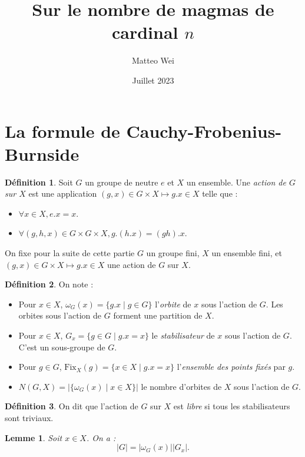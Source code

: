 \documentclass{article}
\title{Sur le nombre de magmas de cardinal $n$}
\author{Matteo Wei}
\date{Juillet 2023}
\newtheorem*{lemme}{Lemme}
\theoremstyle{definition}
\newtheorem*{definition}{Définition}
\theoremstyle{remark}
\begin{document}
\maketitle

\section{La formule de Cauchy-Frobenius-Burnside}

\begin{definition}
    Soit $G$ un groupe de neutre $e$ et $X$ un ensemble. Une \textit{action de $G$ sur $X$} est une application $(g,x)\in G\times X \mapsto g.x\in X$ telle que :
    \begin{itemize}
        \item $\forall x\in X, e.x=x$.
        \item $\forall (g,h,x)\in G\times G\times X, g.(h.x)=(gh).x$.
    \end{itemize}
\end{definition}

On fixe pour la suite de cette partie $G$ un groupe fini, $X$ un ensemble fini, et $(g,x)\in G\times X \mapsto g.x\in X$ une action de $G$ sur $X$.

\begin{definition}
    On note :
    \begin{itemize}
        \item Pour $x\in X$, $\omega_G(x)=\{g.x\mid g\in G\}$ l'\textit{orbite} de $x$ sous l'action de $G$. Les orbites sous l'action de $G$ forment une partition de $X$.
        \item Pour $x\in X$, $G_x=\{g\in G\mid g.x=x\}$ le \textit{stabilisateur} de $x$ sous l'action de $G$. C'est un sous-groupe de $G$.
        \item Pour $g\in G$, $\mathrm{Fix}_X(g)=\{x\in X\mid g.x=x\}$ l'\textit{ensemble des points fixés} par $g$.
        \item $N(G,X)=|\{\omega_G(x)\mid x\in X\}|$ le nombre d'orbites de $X$ sous l'action de $G$.
    \end{itemize}
\end{definition}

\begin{definition}
    On dit que l'action de $G$ sur $X$ est \textit{libre} si tous les stabilisateurs sont triviaux.
\end{definition}

\begin{lemme}
    Soit $x\in X$. On a :
    $$|G|=|\omega_G(x)||G_x|.$$
\end{lemme}
\end{document}
